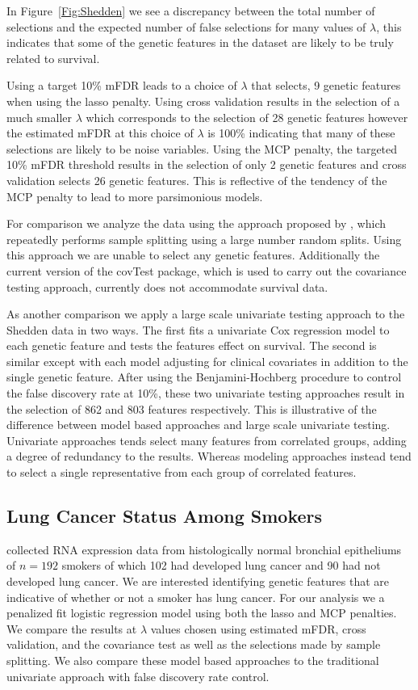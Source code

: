 In Figure~\ref{Fig:Shedden} we see a discrepancy between the total number of selections and the expected number of false selections for many values of $\lambda$, this indicates that some of the genetic features in the dataset are likely to be truly related to survival. 

Using a target 10\% mFDR leads to a choice of $\lambda$ that selects, 9 genetic features when using the lasso penalty. Using cross validation results in the selection of a much smaller $\lambda$ which corresponds to the selection of 28 genetic features however the estimated mFDR at this choice of $\lambda$ is 100\% indicating that many of these selections are likely to be noise variables. Using the MCP penalty, the targeted 10\% mFDR threshold results in the selection of only 2 genetic features and cross validation selects 26 genetic features. This is reflective of the tendency of the MCP penalty to lead to more parsimonious models.

For comparison we analyze the data using the approach proposed by \citet{Meinshausen2009}, which repeatedly performs sample splitting using a large number random splits. Using this approach we are unable to select any genetic features. Additionally the current version of the covTest package, which is used to carry out the covariance testing approach, currently does not accommodate survival data.

As another comparison we apply a large scale univariate testing approach to the Shedden data in two ways. The first fits a univariate Cox regression model to each genetic feature and tests the features effect on survival.  The second is similar except with each model adjusting for clinical covariates in addition to the single genetic feature.  After using the Benjamini-Hochberg procedure to control the false discovery rate at 10\%, these two univariate testing approaches result in the selection of 862 and 803 features respectively. This is illustrative of the difference between model based approaches and large scale univariate testing. Univariate approaches tends select many features from correlated groups, adding a degree of redundancy to the results. Whereas modeling approaches instead tend to select a single representative from each group of correlated features.  

\subsection{Lung Cancer Status Among Smokers}
\citet{Spira2007} collected RNA expression data from histologically normal bronchial epitheliums of $n = 192$ smokers of which 102 had developed lung cancer and 90 had not developed lung cancer.  We are interested identifying genetic features that are indicative of whether or not a smoker has lung cancer.  For our analysis we a penalized fit logistic regression model using both the lasso and MCP penalties. We compare the results at $\lambda$ values chosen using estimated mFDR, cross validation, and the covariance test as well as the selections made by sample splitting. We also compare these model based approaches to the traditional univariate approach with false discovery rate control.

